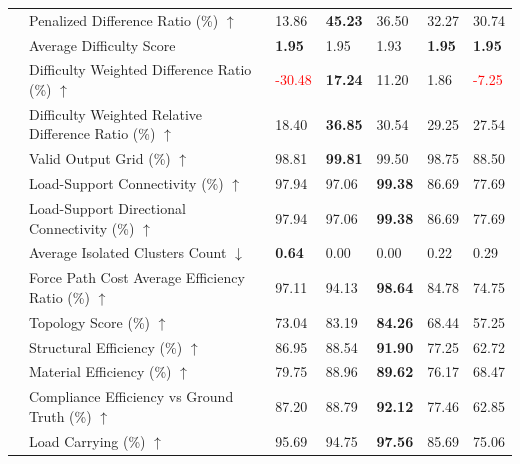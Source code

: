\begin{table}[!h]
{\begin{tabular}{lllllll}
 & Penalized Difference Ratio (\%) $\uparrow$ & 13.86 & \textbf{45.23} & 36.50 & 32.27 & 30.74 \\
 & Average Difficulty Score & \textbf{1.95} & 1.95 & 1.93 & \textbf{1.95} & \textbf{1.95} \\
 & Difficulty Weighted Difference Ratio (\%) $\uparrow$ & \textcolor{red}{-30.48} & \textbf{17.24} & 11.20 & 1.86 & \textcolor{red}{-7.25} \\
 & Difficulty Weighted Relative Difference Ratio (\%) $\uparrow$ & 18.40 & \textbf{36.85} & 30.54 & 29.25 & 27.54 \\
 & Valid Output Grid (\%) $\uparrow$ & 98.81 & \textbf{99.81} & 99.50 & 98.75 & 88.50 \\
 & Load-Support Connectivity (\%) $\uparrow$ & 97.94 & 97.06 & \textbf{99.38} & 86.69 & 77.69 \\
 & Load-Support Directional Connectivity (\%) $\uparrow$ & 97.94 & 97.06 & \textbf{99.38} & 86.69 & 77.69 \\
 & Average Isolated Clusters Count $\downarrow$ & \textbf{0.64} & 0.00 & 0.00 & 0.22 & 0.29 \\
 & Force Path Cost Average Efficiency Ratio (\%) $\uparrow$ & 97.11 & 94.13 & \textbf{98.64} & 84.78 & 74.75 \\
 & Topology Score (\%) $\uparrow$ & 73.04 & 83.19 & \textbf{84.26} & 68.44 & 57.25 \\
 & Structural Efficiency (\%) $\uparrow$ & 86.95 & 88.54 & \textbf{91.90} & 77.25 & 62.72 \\
 & Material Efficiency (\%) $\uparrow$ & 79.75 & 88.96 & \textbf{89.62} & 76.17 & 68.47 \\
 & Compliance Efficiency vs Ground Truth (\%) $\uparrow$ & 87.20 & 88.79 & \textbf{92.12} & 77.46 & 62.85 \\
 & Load Carrying (\%) $\uparrow$ & 95.69 & 94.75 & \textbf{97.56} & 85.69 & 75.06 \\
    \bottomrule
  \end{tabular}
  }
\end{table}